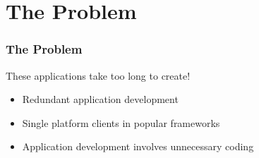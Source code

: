 \documentclass[]{beamer}
\begin{document}
\section{The Problem}


\begin{frame}
\frametitle{The Problem}
These applications take too long to create!
\vspace{.5in}
\begin{itemize}
  \item Redundant application development
  \item Single platform clients in popular frameworks
  \item Application development involves unnecessary coding 
\end{itemize}


\end{frame}





%
%
%
%
%
%
%
\end{document}
